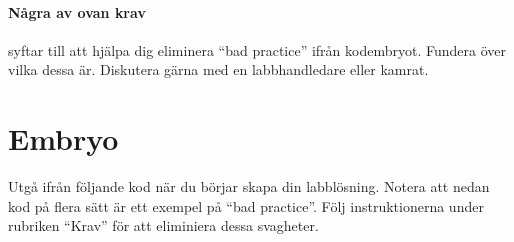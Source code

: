 \documentclass{article}
\begin{document}
\paragraph{Några av ovan krav}
 syftar till att hjälpa dig eliminera ``bad practice'' ifrån kodembryot. Fundera över vilka dessa är. Diskutera gärna med en labbhandledare eller kamrat.



\pagebreak
\section{Embryo}
Utgå ifrån följande kod när du börjar skapa din labblösning. Notera att nedan kod på flera sätt är ett exempel på ``bad practice''. Följ instruktionerna under rubriken ``Krav'' för att eliminiera dessa svagheter.

\end{document}

